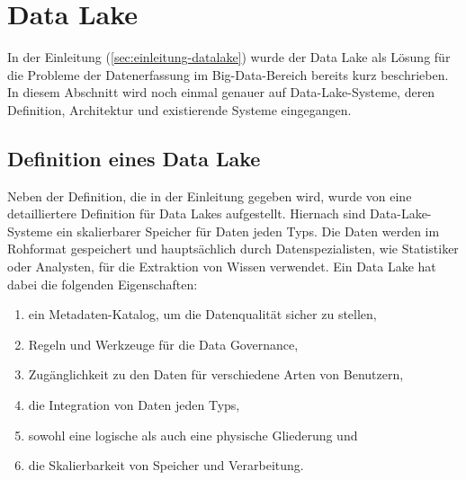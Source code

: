 \section{Data Lake}
In der Einleitung (\cref{sec:einleitung-datalake}) wurde der Data Lake als Lösung für die Probleme der Datenerfassung im Big-Data-Bereich bereits kurz beschrieben.
In diesem Abschnitt wird noch einmal genauer auf Data-Lake-Systeme, deren Definition, Architektur und existierende Systeme eingegangen.

\subsection{Definition eines Data Lake}
Neben der Definition, die in der Einleitung gegeben wird, wurde von \textcite{sawadogo2021data} eine detailliertere Definition für Data Lakes aufgestellt.
Hiernach sind Data-Lake-Systeme ein skalierbarer Speicher für Daten jeden Typs.
Die Daten werden im Rohformat gespeichert und hauptsächlich durch Datenspezialisten, wie Statistiker oder Analysten, für die Extraktion von Wissen verwendet.
Ein Data Lake hat dabei die folgenden Eigenschaften: \begin{enumerate}
    \item ein Metadaten-Katalog, um die Datenqualität sicher zu stellen,
    \item Regeln und Werkzeuge für die Data Governance,
    \item Zugänglichkeit zu den Daten für verschiedene Arten von Benutzern,
    \item die Integration von Daten jeden Typs,
    \item sowohl eine logische als auch eine physische Gliederung und
    \item die Skalierbarkeit von Speicher und Verarbeitung.
\end{enumerate}

